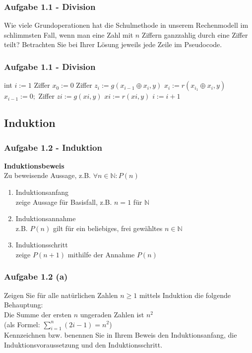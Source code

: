\documentclass{beamer}
\begin{document}
\begin{frame}
	\frametitle{Aufgabe 1.1 - Division}
	Wie viele Grundoperationen hat die Schulmethode in unserem Rechenmodell im schlimmsten
	Fall, wenn man eine Zahl mit $n$ Ziffern ganzzahlig durch eine Ziffer teilt? Betrachten Sie bei
	Ihrer Lösung jeweils jede Zeile im Pseudocode.
\end{frame}

\begin{frame}
	\frametitle{Aufgabe 1.1 - Division}
	\begin{algorithmic}[1]
		\State int $i := 1$
		\State Ziffer $x_0 := 0$
		\State Ziffer $z_i := g(x_{i-1} \oplus  x_i, y)$
		\State $x_i := r(x_{i_1} \oplus x_i, y)$
		\State $x_{i-1} := 0;$
		\Else
		\State Ziffer $zi := g(xi, y)$
		\State $xi := r(xi, y)$
		\EndIf
		\State $i := i + 1$
		\EndWhile
	\end{algorithmic}
\end{frame}


\subsection{Induktion}
\begin{frame}
	\frametitle{Aufgabe 1.2 - Induktion}
	\textbf{Induktionsbeweis} \\
	Zu beweisende Aussage, z.B. $\forall n \in \mathbb{N}: P(n)$
	\begin{enumerate}
		\item Induktionsanfang  \\ zeige Aussage für Basisfall, z.B. $n=1$ für $\mathbb{N}$
		\item Induktionsannahme \\ z.B. $P(n)$ gilt für ein beliebiges, frei gewähltes $n \in \mathbb{N}$
		\item Induktionsschritt  \\ zeige $P(n+1)$ mithilfe der Annahme $P(n)$
	\end{enumerate}
\end{frame}

\begin{frame}
	\frametitle{Aufgabe 1.2 (a)}
	Zeigen Sie für alle natürlichen Zahlen $n \geq 1$ mittels Induktion die folgende Behauptung: \\
	\medskip
	Die Summe der ersten $n$ ungeraden Zahlen ist $n^2$ \\
	(als Formel: $\sum_{i=1}^{n}(2i-1) = n^2$) \\
	\medskip
	Kennzeichnen bzw. benennen Sie in Ihrem Beweis den Induktionsanfang, die Induktionsvoraussetzung und den Induktionsschritt.
\end{frame}
\end{document}

